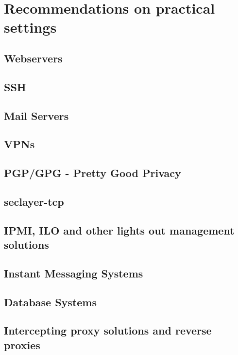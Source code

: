 \newpage
\section{Recommendations on practical settings}
\label{section:PracticalSettings}


\subsection{Webservers}


\newpage
\subsection{SSH}


\newpage
\subsection{Mail Servers}



\newpage
\subsection{VPNs}



\newpage
\subsection{PGP/GPG - Pretty Good Privacy}



\newpage
\subsection{seclayer-tcp}



\newpage
\subsection{IPMI, ILO and other lights out management solutions}





\newpage
\subsection{Instant Messaging Systems}



\newpage
\subsection{Database Systems}



\newpage
\subsection{Intercepting proxy solutions and reverse proxies}
 



